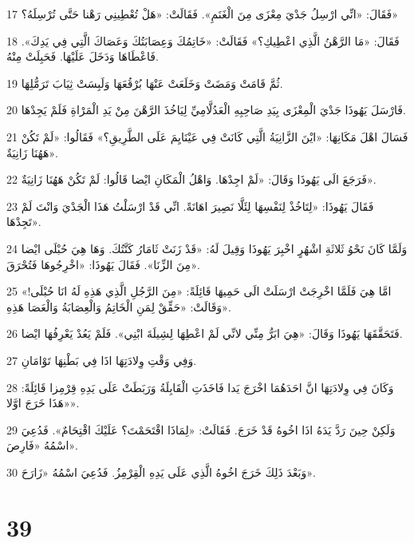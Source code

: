 \par 17 فَقَالَ: «انِّي ارْسِلُ جَدْيَ مِعْزَى مِنَ الْغَنَمِ». فَقَالَتْ: «هَلْ تُعْطِينِي رَهْنا حَتَّى تُرْسِلَهُ؟»
\par 18 فَقَالَ: «مَا الرَّهْنُ الَّذِي اعْطِيكِ؟» فَقَالَتْ: «خَاتِمُكَ وَعِصَابَتُكَ وَعَصَاكَ الَّتِي فِي يَدِكَ». فَاعْطَاهَا وَدَخَلَ عَلَيْهَا. فَحَبِلَتْ مِنْهُ.
\par 19 ثُمَّ قَامَتْ وَمَضَتْ وَخَلَعَتْ عَنْهَا بُرْقُعَهَا وَلَبِسَتْ ثِيَابَ تَرَمُّلِهَا.
\par 20 فَارْسَلَ يَهُوذَا جَدْيَ الْمِعْزَى بِيَدِ صَاحِبِهِ الْعَدُلَّامِيِّ لِيَاخُذَ الرَّهْنَ مِنْ يَدِ الْمَرْاةِ فَلَمْ يَجِدْهَا.
\par 21 فَسَالَ اهْلَ مَكَانِهَا: «ايْنَ الزَّانِيَةُ الَّتِي كَانَتْ فِي عَيْنَايِمَ عَلَى الطَّرِيقِ؟» فَقَالُوا: «لَمْ تَكُنْ هَهُنَا زَانِيَةٌ».
\par 22 فَرَجَعَ الَى يَهُوذَا وَقَالَ: «لَمْ اجِدْهَا. وَاهْلُ الْمَكَانِ ايْضا قَالُوا: لَمْ تَكُنْ هَهُنَا زَانِيَةٌ».
\par 23 فَقَالَ يَهُوذَا: «لِتَاخُذْ لِنَفْسِهَا لِئَلَّا نَصِيرَ اهَانَةً. انِّي قَدْ ارْسَلْتُ هَذَا الْجَدْيَ وَانْتَ لَمْ تَجِدْهَا».
\par 24 وَلَمَّا كَانَ نَحْوُ ثَلاثَةِ اشْهُرٍ اخْبِرَ يَهُوذَا وَقِيلَ لَهُ: «قَدْ زَنَتْ ثَامَارُ كَنَّتُكَ. وَهَا هِيَ حُبْلَى ايْضا مِنَ الزِّنَا». فَقَالَ يَهُوذَا: «اخْرِجُوهَا فَتُحْرَقَ».
\par 25 امَّا هِيَ فَلَمَّا اخْرِجَتْ ارْسَلَتْ الَى حَمِيهَا قَائِلَةً: «مِنَ الرَّجُلِ الَّذِي هَذِهِ لَهُ انَا حُبْلَى!» وَقَالَتْ: «حَقِّقْ لِمَنِ الْخَاتِمُ وَالْعِصَابَةُ وَالْعَصَا هَذِهِ».
\par 26 فَتَحَقَّقَهَا يَهُوذَا وَقَالَ: «هِيَ ابَرُّ مِنِّي لانِّي لَمْ اعْطِهَا لِشِيلَةَ ابْنِي». فَلَمْ يَعُدْ يَعْرِفُهَا ايْضا.
\par 27 وَفِي وَقْتِ وِلادَتِهَا اذَا فِي بَطْنِهَا تَوْامَانِ.
\par 28 وَكَانَ فِي وِلادَتِهَا انَّ احَدَهُمَا اخْرَجَ يَدا فَاخَذَتِ الْقَابِلَةُ وَرَبَطَتْ عَلَى يَدِهِ قِرْمِزا قَائِلَةً: «هَذَا خَرَجَ اوَّلا».
\par 29 وَلَكِنْ حِينَ رَدَّ يَدَهُ اذَا اخُوهُ قَدْ خَرَجَ. فَقَالَتْ: «لِمَاذَا اقْتَحَمْتَ؟ عَلَيْكَ اقْتِحَامٌ». فَدُعِيَ اسْمُهُ «فَارِصَ».
\par 30 وَبَعْدَ ذَلِكَ خَرَجَ اخُوهُ الَّذِي عَلَى يَدِهِ الْقِرْمِزُ. فَدُعِيَ اسْمُهُ «زَارَحَ».

\chapter{39}

